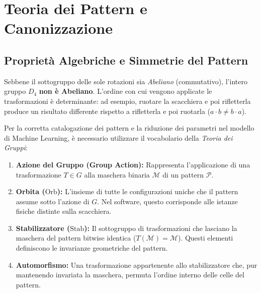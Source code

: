 %
%
%
%
%
%
%


\section{Teoria dei Pattern e Canonizzazione}

\subsection{Proprietà Algebriche e Simmetrie del Pattern}
Sebbene il sottogruppo delle sole rotazioni sia \textit{Abeliano} (commutativo), l'intero gruppo $D_4$ \textbf{non è Abeliano}. L'ordine con cui vengono applicate le trasformazioni è determinante: ad esempio, ruotare la scacchiera e poi rifletterla produce un risultato differente rispetto a rifletterla e poi ruotarla ($a \cdot b \neq b \cdot a$).

Per la corretta catalogazione dei pattern e la riduzione dei parametri nel modello di Machine Learning, è necessario utilizzare il vocabolario della \textit{Teoria dei Gruppi}:

\begin{enumerate}
    \item \textbf{Azione del Gruppo (Group Action):} Rappresenta l'applicazione di una trasformazione $T \in G$ alla maschera binaria $\mathcal{M}$ di un pattern $\mathcal{P}$.
    \item \textbf{Orbita ($\text{Orb}$):} L'insieme di tutte le configurazioni uniche che il pattern assume sotto l'azione di $G$. Nel software, questo corrisponde alle istanze fisiche distinte sulla scacchiera.
    \item \textbf{Stabilizzatore ($\text{Stab}$):} Il sottogruppo di trasformazioni che lasciano la maschera del pattern bitwise identica ($T(\mathcal{M}) = \mathcal{M}$). Questi elementi definiscono le invarianze geometriche del pattern.
    \item \textbf{Automorfismo:} Una trasformazione appartenente allo stabilizzatore che, pur mantenendo invariata la maschera, permuta l'ordine interno delle celle del pattern.
\end{enumerate}


